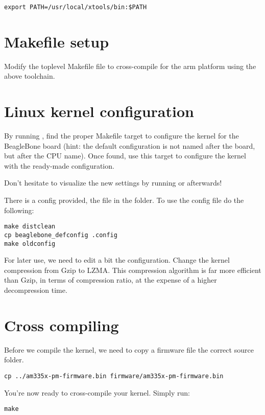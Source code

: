 \begin{verbatim}
export PATH=/usr/local/xtools/bin:$PATH
\end{verbatim}

\section{Makefile setup}

Modify the toplevel Makefile file to cross-compile for the arm
platform using the above toolchain.

\section{Linux kernel configuration}

By running , find the proper Makefile target to
configure the kernel for the BeagleBone board (hint: the default
configuration is not named after the board, but after the CPU
name). Once found, use this target to configure the kernel with the
ready-made configuration.

Don't hesitate to visualize the new settings by running
 or  afterwards!

There is a config provided, the  file in the  folder.
To use the config file do the following:

\begin{verbatim}
make distclean
cp beaglebone_defconfig .config
make oldconfig
\end{verbatim}

For later use, we need to edit a bit the configuration. Change the
kernel compression from Gzip to LZMA. This compression algorithm is
far more efficient than Gzip, in terms of compression ratio, at the
expense of a higher decompression time.

\section{Cross compiling}

Before we compile the kernel, we need to copy a firmware file the correct source folder.
\begin{verbatim}
cp ../am335x-pm-firmware.bin firmware/am335x-pm-firmware.bin
\end{verbatim}

You're now ready to cross-compile your kernel. Simply run:

\begin{verbatim}
make
\end{verbatim}


